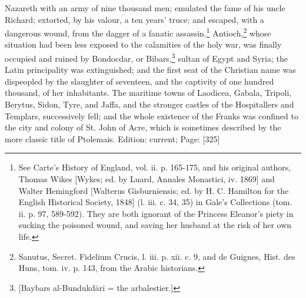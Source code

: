 Nazareth with an army of nine thousand men; emulated the fame of his uncle Richard; extorted, by his valour, a ten years\texthebrew{}’ truce; and escaped, with a dangerous wound, from the dagger of a fanatic assassin.\footnote{See Carte\texthebrew{}’s History of England, vol. ii. p. 165-175, and his original authors, Thomas Wikes [Wykes; ed. by Luard, Annales Monastici, iv. 1869] and Walter Hemingford [Walterus Gisburniensis; ed. by H. C. Hamilton for the English Historical Society, 1848] (l. iii. c. 34, 35) in Gale\texthebrew{}’s Collections (tom. ii. p. 97, 589-592). They are both ignorant of the Princess Eleanor\texthebrew{}’s piety in sucking the poisoned wound, and saving her husband at the risk of her own life.} Antioch,\footnote{Sanutus, Secret. Fidelium Crucis, l. iii. p. xii. c. 9, and de Guignes, Hist. des Huns, tom. iv. p. 143, from the Arabic historians.} whose situation had been less exposed to the calamities of the holy war, was finally occupied and ruined by Bondocdar, or Bibars,\footnote{[Baybars al-Bundukdārī = the arbalestier.]} sultan of Egypt and Syria; the Latin principality was extinguished; and the first seat of the Christian name was dispeopled by the slaughter of seventeen, and the captivity of one hundred thousand, of her inhabitants. The maritime towns of Laodicea, Gabala, Tripoli, Berytus, Sidon, Tyre, and Jaffa, and the stronger castles of the Hospitallers and Templars, successively fell; and the whole existence of the Franks was confined to the city and colony of St. John of Acre, which is sometimes described by the more classic title of Ptolemais.
Edition: current; Page: [325]

